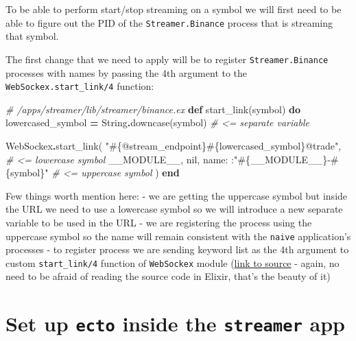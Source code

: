 \documentclass[
]{book}
\newenvironment{Shaded}{\begin{snugshade}}{\end{snugshade}}
\newcommand{\CommentTok}[1]{\textcolor[rgb]{0.56,0.35,0.01}{\textit{#1}}}
\newcommand{\ConstantTok}[1]{\textcolor[rgb]{0.00,0.00,0.00}{#1}}
\newcommand{\KeywordTok}[1]{\textcolor[rgb]{0.13,0.29,0.53}{\textbf{#1}}}
\newcommand{\NormalTok}[1]{#1}
\newcommand{\OperatorTok}[1]{\textcolor[rgb]{0.81,0.36,0.00}{\textbf{#1}}}
\newcommand{\OtherTok}[1]{\textcolor[rgb]{0.56,0.35,0.01}{#1}}
\newcommand{\StringTok}[1]{\textcolor[rgb]{0.31,0.60,0.02}{#1}}
\newcommand{\VariableTok}[1]{\textcolor[rgb]{0.00,0.00,0.00}{#1}}
\begin{document}
To be able to perform start/stop streaming on a symbol we will first need to be able to figure out the PID of the \texttt{Streamer.Binance} process that is streaming that symbol.

The first change that we need to apply will be to register \texttt{Streamer.Binance} processes with names by passing the 4th argument to the \texttt{WebSockex.start\_link/4} function:

\begin{Shaded}
\begin{Highlighting}[]
  \CommentTok{\# /apps/streamer/lib/streamer/binance.ex}
  \KeywordTok{def}\NormalTok{ start\_link(symbol) }\KeywordTok{do}
\NormalTok{    lowercased\_symbol }\OperatorTok{=} \ConstantTok{String}\OperatorTok{.}\NormalTok{downcase(symbol) }\CommentTok{\# \textless{}= separate variable}

    \ConstantTok{WebSockex}\OperatorTok{.}\NormalTok{start\_link(}
      \StringTok{"}\OtherTok{\#\{@stream\_endpoint\}\#\{}\NormalTok{lowercased\_symbol}\OtherTok{\}}\StringTok{@trade"}\NormalTok{, }\CommentTok{\# \textless{}= lowercase symbol}
      \ConstantTok{\_\_MODULE\_\_}\NormalTok{,}
      \ConstantTok{nil}\NormalTok{,}
      \VariableTok{name:}\NormalTok{ :}\StringTok{"}\OtherTok{\#\{}\ConstantTok{\_\_MODULE\_\_}\OtherTok{\}}\StringTok{{-}}\OtherTok{\#\{}\NormalTok{symbol}\OtherTok{\}}\StringTok{"} \CommentTok{\# \textless{}= uppercase symbol}
\NormalTok{    )}
  \KeywordTok{end}
\end{Highlighting}
\end{Shaded}

Few things worth mention here:
- we are getting the uppercase symbol but inside the URL we need to use a lowercase symbol so we will introduce a new separate variable to be used in the URL
- we are registering the process using the uppercase symbol so the name will remain consistent with the \texttt{naive} application's processes
- to register process we are sending keyword list as the 4th argument to custom \texttt{start\_link/4} function of \texttt{WebSockex} module (\href{https://github.com/Azolo/websockex/blob/master/lib/websockex.ex\#L376}{link to source} - again, no need to be afraid of reading the source code in Elixir, that's the beauty of it)

\hypertarget{set-up-ecto-inside-the-streamer-app}{%
\section{\texorpdfstring{Set up \texttt{ecto} inside the \texttt{streamer} app}{Set up ecto inside the streamer app}}\label{set-up-ecto-inside-the-streamer-app}}
\end{document}
